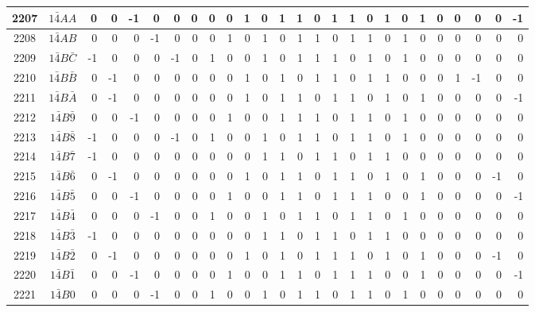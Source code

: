 \documentclass[12 pt]{article}%
\begin{document}
\begin{tiny}
\begin{centering}
\begin{longtable}{|c|c||rrrrrrrrrrrrrrrrrrrrrrrr|}
      \hline
      2207 & $1\bar4AA$ & 0 & 0 & -1 & 0 & 0 & 0 & 0 & 0 & 1 & 0 & 1 & 1 & 0 & 1 & 1 & 0 & 1 & 0 & 1 & 0 & 0 & 0 & 0 & -1 \\
      \hline
      2208 & $1\bar4AB$ & 0 & 0 & 0 & -1 & 0 & 0 & 0 & 1 & 0 & 1 & 0 & 1 & 1 & 0 & 1 & 1 & 0 & 1 & 0 & 0 & 0 & 0 & 0 & 0 \\
      \hline
      2209 & $1\bar4B\bar C$ & -1 & 0 & 0 & 0 & -1 & 0 & 1 & 0 & 0 & 1 & 0 & 1 & 1 & 1 & 0 & 1 & 0 & 1 & 0 & 0 & 0 & 0 & 0 & 0 \\
      \hline
      2210 & $1\bar4B\bar B$ & 0 & -1 & 0 & 0 & 0 & 0 & 0 & 0 & 1 & 0 & 1 & 0 & 1 & 1 & 0 & 1 & 1 & 0 & 0 & 0 & 1 & -1 & 0 & 0 \\
      \hline
      2211 & $1\bar4B\bar A$ & 0 & -1 & 0 & 0 & 0 & 0 & 0 & 0 & 1 & 0 & 1 & 1 & 0 & 1 & 1 & 0 & 1 & 0 & 1 & 0 & 0 & 0 & 0 & -1 \\
      \hline
      2212 & $1\bar4B\bar9$ & 0 & 0 & -1 & 0 & 0 & 0 & 0 & 1 & 0 & 0 & 1 & 1 & 1 & 0 & 1 & 1 & 0 & 1 & 0 & 0 & 0 & 0 & 0 & 0 \\
      \hline
      2213 & $1\bar4B\bar8$ & -1 & 0 & 0 & 0 & -1 & 0 & 1 & 0 & 0 & 1 & 0 & 1 & 1 & 0 & 1 & 1 & 0 & 1 & 0 & 0 & 0 & 0 & 0 & 0 \\
      \hline
      2214 & $1\bar4B\bar7$ & -1 & 0 & 0 & 0 & 0 & 0 & 0 & 0 & 0 & 1 & 1 & 0 & 1 & 1 & 0 & 1 & 1 & 0 & 0 & 0 & 0 & 0 & 0 & 0 \\
      \hline
      2215 & $1\bar4B\bar6$ & 0 & -1 & 0 & 0 & 0 & 0 & 0 & 0 & 1 & 0 & 1 & 1 & 0 & 1 & 1 & 0 & 1 & 0 & 1 & 0 & 0 & 0 & -1 & 0 \\
      \hline
      2216 & $1\bar4B\bar5$ & 0 & 0 & -1 & 0 & 0 & 0 & 0 & 1 & 0 & 0 & 1 & 1 & 0 & 1 & 1 & 1 & 0 & 0 & 1 & 0 & 0 & 0 & 0 & -1 \\
      \hline
      2217 & $1\bar4B\bar4$ & 0 & 0 & 0 & -1 & 0 & 0 & 1 & 0 & 0 & 1 & 0 & 1 & 1 & 0 & 1 & 1 & 0 & 1 & 0 & 0 & 0 & 0 & 0 & 0 \\
      \hline
      2218 & $1\bar4B\bar3$ & -1 & 0 & 0 & 0 & 0 & 0 & 0 & 0 & 0 & 1 & 1 & 0 & 1 & 1 & 0 & 1 & 1 & 0 & 0 & 0 & 0 & 0 & 0 & 0 \\
      \hline
      2219 & $1\bar4B\bar2$ & 0 & -1 & 0 & 0 & 0 & 0 & 0 & 0 & 1 & 0 & 1 & 0 & 1 & 1 & 1 & 0 & 1 & 0 & 1 & 0 & 0 & 0 & -1 & 0 \\
      \hline
      2220 & $1\bar4B\bar1$ & 0 & 0 & -1 & 0 & 0 & 0 & 0 & 1 & 0 & 0 & 1 & 1 & 0 & 1 & 1 & 1 & 0 & 0 & 1 & 0 & 0 & 0 & 0 & -1 \\
      \hline
      2221 & $1\bar4B0$ & 0 & 0 & 0 & -1 & 0 & 0 & 1 & 0 & 0 & 1 & 0 & 1 & 1 & 0 & 1 & 1 & 0 & 1 & 0 & 0 & 0 & 0 & 0 & 0 \\

\end{longtable}
\end{centering}
\end{tiny}
\end{document}
